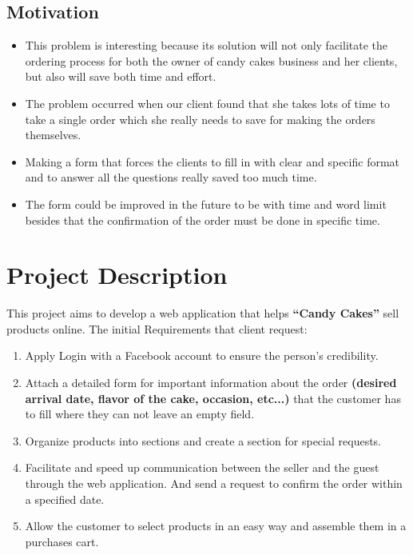 \documentclass[hidelinks,a4paper,12pt]{article}
\begin{document}
\subsection{Motivation}
\begin{itemize}

\item This problem is interesting because its solution will not only facilitate the ordering process for both the owner of candy cakes business and her clients, but also will save both time and effort.

\item The problem occurred when our client found that she takes lots of time to take a single order which she really needs to save for making the orders themselves.

\item Making a form that forces the clients to fill in with clear and specific format and to answer all the questions really saved too much time.

\item The form could be improved in the future to be with time and word limit besides that the confirmation of the order must be done in specific time.
\end{itemize}



\section{Project Description}

This project aims to develop a web application that helps \textbf{“Candy Cakes”} sell products online.
The initial Requirements that client request:
\begin{enumerate}
\item Apply Login with a Facebook account to ensure the person's credibility.
\item Attach a detailed form for important information about the order \textbf{(desired arrival date, flavor of the cake, occasion, etc...)} that the customer has to fill where they can not leave an empty field.
\item Organize products into sections and create a section for special requests.
\item Facilitate and speed up communication between the seller and the guest through the web application. And send a request to confirm the order within a specified date.
\item Allow the customer to select products in an easy way and assemble them in a purchases cart.
\end{enumerate}
\end{document}
